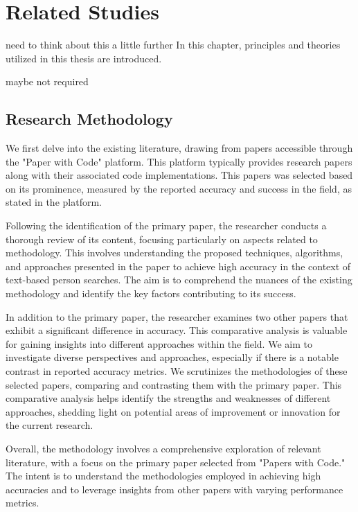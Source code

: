 \chapter{Related Studies }
{\color{red} need to think about this a little further}
In this chapter, principles and theories utilized in this thesis are introduced.


{\color{red}maybe not required}
\section{Research Methodology}
We first delve into the existing literature, drawing from papers accessible through the "Paper with Code" platform. This platform typically provides research papers along with their associated code implementations. {\color{red}This papers was selected based on its prominence, measured by the reported accuracy and success in the field, as stated in the platform.}

Following the identification of the primary paper, the researcher conducts a thorough review of its content, focusing particularly on aspects related to methodology. This involves understanding the proposed techniques, algorithms, and approaches presented in the paper to achieve high accuracy in the context of text-based person searches. The aim is to comprehend the nuances of the existing methodology and identify the key factors contributing to its success.

In addition to the primary paper, the researcher examines two other papers that exhibit a significant difference in accuracy. This comparative analysis is valuable for gaining insights into different approaches within the field. We aim to investigate diverse perspectives and approaches, especially if there is a notable contrast in reported accuracy metrics.
We scrutinizes the methodologies of these selected papers, comparing and contrasting them with the primary paper. This comparative analysis helps identify the strengths and weaknesses of different approaches, shedding light on potential areas of improvement or innovation for the current research.

Overall, the methodology involves a comprehensive exploration of relevant literature, with a focus on the primary paper selected from "Papers with Code." The intent is to understand the methodologies employed in achieving high accuracies and to leverage insights from other papers with varying performance metrics. 

